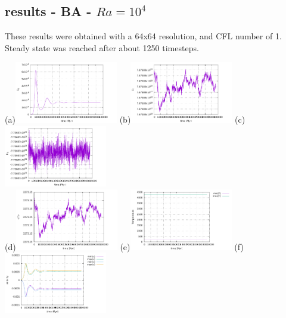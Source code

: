 \newpage
\subsection*{results - BA - $Ra=10^4$}

These results were obtained with a 64x64 resolution, and CFL number of 1. Steady state was reached 
after about 1250 timesteps.

\begin{center}
(a)\includegraphics[width=4.5cm]{python_codes/fieldstone_24/BA_104/EK}
(b)\includegraphics[width=4.5cm]{python_codes/fieldstone_24/BA_104/ET}
(c)\includegraphics[width=4.5cm]{python_codes/fieldstone_24/BA_104/EG}\\
(d)\includegraphics[width=4.5cm]{python_codes/fieldstone_24/BA_104/Tavrg}
(e)\includegraphics[width=4.5cm]{python_codes/fieldstone_24/BA_104/T_stats}
(f)\includegraphics[width=4.5cm]{python_codes/fieldstone_24/BA_104/vel_stats}\\

\end{center}
